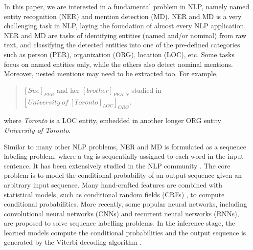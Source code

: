 \documentclass[11pt,a4paper]{article}
\begin{document}
In this paper, we are interested in a fundamental problem in NLP, namely named entity recognition (NER) and mention detection (MD). NER and MD is a very challenging task in NLP, laying the foundation of almost every NLP application.
NER and MD are tasks of identifying entities (named and/or nominal) from raw text, and classifying the detected entities into one of the pre-defined categories such as person (PER), organization (ORG), location (LOC), etc. Some tasks focus on named entities only, 
while the others also detect nominal mentions. %
Moreover, nested mentions may need to be extracted too. For example, 
\begin{quote}
	\small
	$[Sue]_{PER}$ and her $[brother]_{PER\_N}$ studied in ${[University\ of\ {[Toronto]}_{LOC}]}_{ORG}$. 
\end{quote}
where {\it Toronto} is a LOC entity, embedded in another longer ORG entity {\it University of Toronto}.

Similar to many other NLP problems, NER and MD is formulated as a sequence labeling problem, where a tag is sequentially assigned to each word in the input sentence. It has been extensively studied in the NLP community \cite{borthwick1998exploiting}. The core problem is to model the conditional probability of an output sequence given an arbitrary input sequence. Many hand-crafted features are combined with statistical models, such as conditional random fields (CRFs) \cite{nguyen2010kernel}, to compute conditional probabilities. More recently, some popular neural networks, including convolutional neural networks (CNNs) and recurrent neural networks (RNNs), are proposed to solve sequence labelling problems.
In the inference stage, the learned models compute the conditional probabilities and the output sequence is generated by the 
Viterbi decoding algorithm \cite{Viterbi1967err}. 
\end{document}
